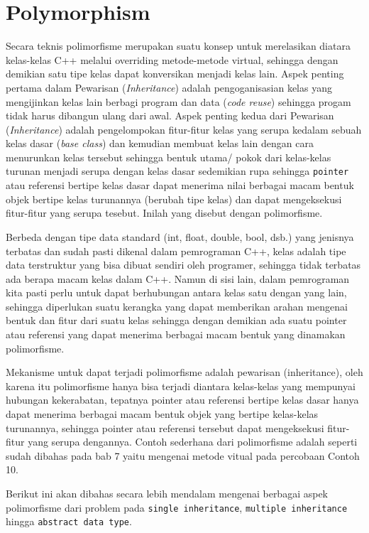 \section{Polymorphism}\label{polymorphism}

Secara teknis polimorfisme merupakan suatu konsep untuk merelasikan
diatara kelas-kelas C++ melalui overriding metode-metode virtual,
sehingga dengan demikian satu tipe kelas dapat konversikan menjadi kelas
lain. Aspek penting pertama dalam Pewarisan (\emph{Inheritance}) adalah
pengoganisasian kelas yang mengijinkan kelas lain berbagi program dan
data (\emph{code reuse}) sehingga progam tidak harus dibangun ulang dari
awal. Aspek penting kedua dari Pewarisan (\emph{Inheritance}) adalah
pengelompokan fitur-fitur kelas yang serupa kedalam sebuah kelas dasar
(\emph{base class}) dan kemudian membuat kelas lain dengan cara
menurunkan kelas tersebut sehingga bentuk utama/ pokok dari kelas-kelas
turunan menjadi serupa dengan kelas dasar sedemikian rupa sehingga
\texttt{pointer} atau referensi bertipe kelas dasar dapat menerima nilai
berbagai macam bentuk objek bertipe kelas turunannya (berubah tipe
kelas) dan dapat mengeksekusi fitur-fitur yang serupa tesebut. Inilah
yang disebut dengan polimorfisme.

Berbeda dengan tipe data standard (int, float, double, bool, dsb.) yang
jenisnya terbatas dan sudah pasti dikenal dalam pemrograman C++, kelas
adalah tipe data terstruktur yang bisa dibuat sendiri oleh programer,
sehingga tidak terbatas ada berapa macam kelas dalam C++. Namun di sisi
lain, dalam pemrograman kita pasti perlu untuk dapat berhubungan antara
kelas satu dengan yang lain, sehingga diperlukan suatu kerangka yang
dapat memberikan arahan mengenai bentuk dan fitur dari suatu kelas
sehingga dengan demikian ada suatu pointer atau referensi yang dapat
menerima berbagai macam bentuk yang dinamakan polimorfisme.

Mekanisme untuk dapat terjadi polimorfisme adalah pewarisan
(inheritance), oleh karena itu polimorfisme hanya bisa terjadi diantara
kelas-kelas yang mempunyai hubungan kekerabatan, tepatnya pointer atau
referensi bertipe kelas dasar hanya dapat menerima berbagai macam bentuk
objek yang bertipe kelas-kelas turunannya, sehingga pointer atau
referensi tersebut dapat mengeksekusi fitur-fitur yang serupa dengannya.
Contoh sederhana dari polimorfisme adalah seperti sudah dibahas pada bab
7 yaitu mengenai metode vitual pada percobaan Contoh 10.

Berikut ini akan dibahas secara lebih mendalam mengenai berbagai aspek
polimorfisme dari problem pada \texttt{single\ inheritance},
\texttt{multiple\ inheritance} hingga \texttt{abstract\ data\ type}.

